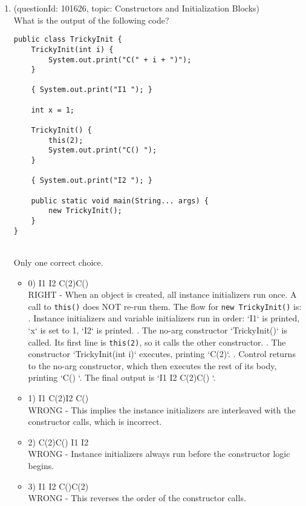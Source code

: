 \documentclass[12pt]{article}
\begin{document}
\begin{enumerate}[label=(\arabic*)]
\begin{itemize}
\end{itemize}
\item (questionId: 101626, topic: Constructors and Initialization Blocks) \\ 
What is the output of the following code?\n\begin{verbatim}
public class TrickyInit {
    TrickyInit(int i) {
        System.out.print("C(" + i + ")");
    }

    { System.out.print("I1 "); }

    int x = 1;

    TrickyInit() {
        this(2);
        System.out.print("C() ");
    }

    { System.out.print("I2 "); }

    public static void main(String... args) {
        new TrickyInit();
    }
}
\end{verbatim}
\\ \noindent Only one correct choice. 
\begin{itemize}
\item 0) I1 I2 C(2)C()
 \\ 
RIGHT - When an object is created, all instance initializers run once. A call to \verb|this()| does NOT re-run them. The flow for \verb|new TrickyInit()| is: . Instance initializers and variable initializers run in order: `I1` is printed, `x` is set to 1, `I2` is printed. . The no-arg constructor `TrickyInit()` is called. Its first line is \verb|this(2)|, so it calls the other constructor. . The constructor `TrickyInit(int i)` executes, printing `C(2)`. . Control returns to the no-arg constructor, which then executes the rest of its body, printing `C() `. \newline The final output is `I1 I2 C(2)C() `.

\item 1) I1 C(2)I2 C()
 \\ 
WRONG - This implies the instance initializers are interleaved with the constructor calls, which is incorrect.

\item 2) C(2)C() I1 I2
 \\ 
WRONG - Instance initializers always run before the constructor logic begins.

\item 3) I1 I2 C()C(2)
 \\ 
WRONG - This reverses the order of the constructor calls.


\end{itemize}
\end{enumerate}
\end{document}
